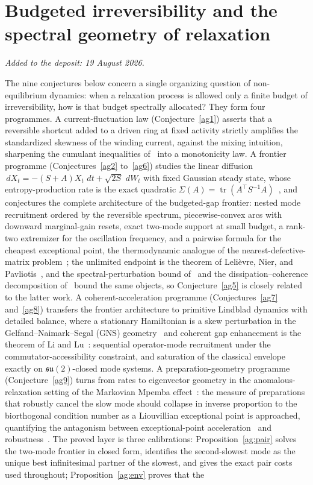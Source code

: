 \documentclass[11pt]{article}
\theoremstyle{definition}
\newcommand{\dd}{\,d}
\begin{document}
\part{Budgeted irreversibility and the spectral geometry of relaxation}

\medskip\noindent\emph{Added to the deposit: 19 August 2026.}\par\medskip

The nine conjectures below concern a single organizing question of non-equilibrium dynamics: when a relaxation process is allowed only a finite budget of irreversibility, how is that budget spectrally allocated?  They form four programmes.  A current-fluctuation law (Conjecture~\ref{ag1}) asserts that a reversible shortcut added to a driven ring at fixed activity strictly amplifies the standardized skewness of the winding current, against the mixing intuition, sharpening the cumulant inequalities of~\cite{WB22,Pta22} into a monotonicity law.  A frontier programme (Conjectures~\ref{ag2} to~\ref{ag6}) studies the linear diffusion $\dd X_t=-(S+A)X_t\,\dd t+\sqrt{2S}\,\dd W_t$ with fixed Gaussian steady state, whose entropy-production rate is the exact quadratic $\Sigma(A)=\operatorname{tr}(A^\top S^{-1}A)$~\cite{GL19}, and conjectures the complete architecture of the budgeted-gap frontier: nested mode recruitment ordered by the reversible spectrum, piecewise-convex arcs with downward marginal-gain resets, exact two-mode support at small budget, a rank-two extremizer for the oscillation frequency, and a pairwise formula for the cheapest exceptional point, the thermodynamic analogue of the nearest-defective-matrix problem~\cite{ABBO11}; the unlimited endpoint is the theorem of Leli\`evre, Nier, and Pavliotis~\cite{LNP13}, and the spectral-perturbation bound of~\cite{KOI24} and the dissipation--coherence decomposition of~\cite{NKI26} bound the same objects, so Conjecture~\ref{ag5} is closely related to the latter work.  A coherent-acceleration programme (Conjectures~\ref{ag7} and~\ref{ag8}) transfers the frontier architecture to primitive Lindblad dynamics with detailed balance, where a stationary Hamiltonian is a skew perturbation in the Gelfand--Naimark--Segal (GNS) geometry~\cite{Alicki76} and coherent gap enhancement is the theorem of Li and Lu~\cite{LiLu24}: sequential operator-mode recruitment under the commutator-accessibility constraint, and saturation of the classical envelope exactly on $\mathfrak{su}(2)$-closed mode systems.  A preparation-geometry programme (Conjecture~\ref{ag9}) turns from rates to eigenvector geometry in the anomalous-relaxation setting of the Markovian Mpemba effect~\cite{LR17,KRHV19}: the measure of preparations that robustly cancel the slow mode should collapse in inverse proportion to the biorthogonal condition number as a Liouvillian exceptional point is approached, quantifying the antagonism between exceptional-point acceleration~\cite{ZXW25,CTH24} and robustness~\cite{MP26}.  The proved layer is three calibrations: Proposition~\ref{ag:pair} solves the two-mode frontier in closed form, identifies the second-slowest mode as the unique best infinitesimal partner of the slowest, and gives the exact pair costs used throughout; Proposition~\ref{ag:env} proves that the 
\end{document}
